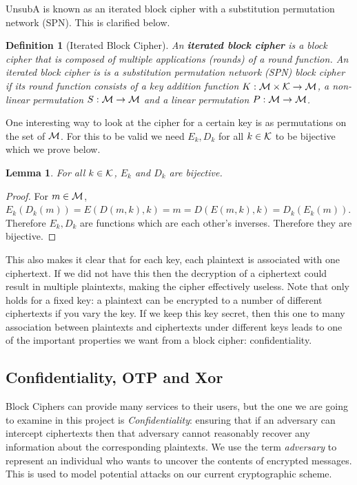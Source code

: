 \documentclass[12pt,a4paper]{article}
\newtheorem{definition}[theorem]{Definition}
\newtheorem{lemma}[theorem]{Lemma}
\begin{document}
UnsubA is known as an iterated block cipher with a substitution permutation
network (SPN). This is clarified below.

\begin{definition}[Iterated Block Cipher]
An \textbf{iterated block cipher} is a block cipher that is composed of
multiple applications (rounds) of a round function. An iterated block cipher is
is a substitution permutation network (SPN) block cipher if its round function
consists of a key addition function $K:\cal{M} \times \cal{K} \rightarrow \cal{M}$, a non-linear permutation $S:\cal{M}
\rightarrow \cal{M}$ and a linear permutation $P: \cal{M} \rightarrow \cal{M}$. 
\end{definition}

One interesting way to look at the cipher for a certain key is as permutations
on the set of $\cal{M}$. For this to be valid we need $E_k,D_k$ for all
$k \in \cal{K}$ to be bijective which we prove below.

\begin{lemma}
For all $k \in \cal{K}$, $E_k$ and $D_k$ are bijective.
\end{lemma}
\begin{proof}
For $m \in \cal{M}$, $E_k(D_k(m)) = E(D(m,k),k) = m = D(E(m,k),k) =
D_k(E_k(m))$. Therefore $E_k, D_k$ are functions which are each other's
inverses. Therefore they are bijective.
\end{proof}

This also makes it clear that for each key, each plaintext is associated with
one ciphertext. If we did not have this then the decryption of a ciphertext
could result in multiple plaintexts, making the cipher effectively useless.
Note that only holds for a fixed key: a plaintext can be encrypted to a number
of different ciphertexts if you vary the key. If we keep this key secret, then
this one to many association between plaintexts and ciphertexts under different
keys leads to one of the important properties we want from a block cipher:
confidentiality.

\subsection{Confidentiality, OTP and Xor}
Block Ciphers can provide many services to their users, but the one
we are going to examine in this project is \textit{Confidentiality}: ensuring
that if an adversary can intercept ciphertexts then that adversary cannot
reasonably recover any information about the corresponding plaintexts. We use
the term \textit{adversary} to represent an individual who wants to uncover the contents
of encrypted messages. This is used to model potential attacks on our current
cryptographic scheme.
\end{document}

